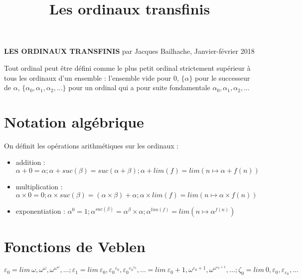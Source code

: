 \documentclass[8pt]{article}
\title{Les ordinaux transfinis}
\begin{document}
\setlength{\parindent}{0pt}

\vspace{-0.4cm}

\begin{center}
\textbf{LES ORDINAUX TRANSFINIS} par Jacques Bailhache, Janvier-février 2018
\end{center}

\vspace{-0.2cm}

Tout ordinal peut être défini comme le plus petit ordinal strictement supérieur à tous les ordinaux d'un ensemble : l'ensemble vide pour 0, \(\lbrace \alpha \rbrace\) pour le successeur de \(\alpha\), \(\lbrace \alpha_0,\alpha_1,\alpha_2,...\rbrace\) pour un ordinal qui a pour suite fondamentale \(\alpha_0, \alpha_1, \alpha_2, ...\)

\vspace{-0.7cm}

\section{Notation algébrique}
\vspace{-0.4cm}
On définit les opérations arithmétiques sur les ordinaux :
\vspace{-0.4cm}
\smallskip
\begin{itemize}
     \setlength{\itemsep}{1pt}
     \setlength{\parskip}{0pt}
     \setlength{\parsep}{0pt}
\item addition : \( \alpha+0=\alpha ; \alpha+suc(\beta)=suc(\alpha+\beta); \alpha+lim(f)=lim(n \mapsto \alpha+f(n)) \)
\vspace{-0.1cm}
\item multiplication : \( \alpha \times 0 = 0 ; \alpha \times suc(\beta) = (\alpha \times \beta) + \alpha ; \alpha \times lim(f) = lim (n \mapsto \alpha \times f(n)) \)
\vspace{-0.1cm}
\item exponentiation : \( \alpha^0 = 1 ; \alpha^{suc(\beta)} = \alpha^\beta \times \alpha ; \alpha^{lim(f)} = lim (n \mapsto \alpha^{f(n)}) \)
\end{itemize}
\vspace{-0.9cm}

\section{Fonctions de Veblen}
\vspace{-0.4cm}

\( \varepsilon_0 = lim\ \omega, \omega^\omega, \omega^{\omega^\omega}, \ldots ; \varepsilon_1 = lim\ \varepsilon_0, {\varepsilon_0}^{\varepsilon_0}, {\varepsilon_0}^{{\varepsilon_0}^{\varepsilon_0}}, \ldots = lim\ \varepsilon_0+1, \omega^{\varepsilon_0+1}, \omega^{\omega^{\varepsilon_0+1}}, \ldots ; \zeta_0 = lim\ 0, \varepsilon_0, \varepsilon_{\varepsilon_0}, \ldots \)
\end{document}
